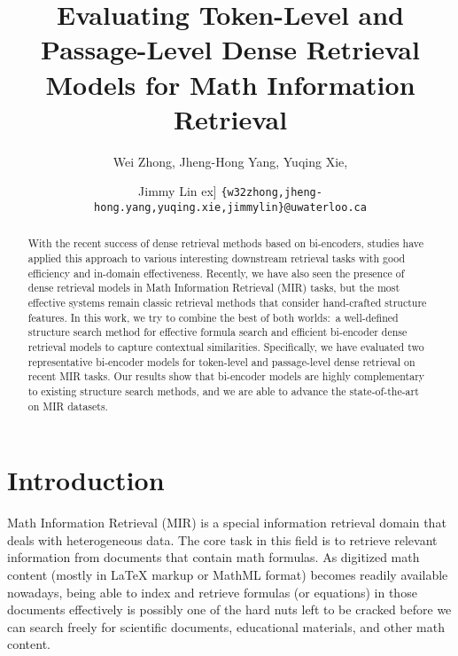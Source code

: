 \documentclass[11pt]{article}
\title{Evaluating Token-Level and Passage-Level Dense Retrieval Models for Math Information Retrieval}
\author{Wei Zhong, Jheng-Hong Yang, Yuqing Xie, \and Jimmy Lin \1ex]
  \texttt{\{w32zhong,jheng-hong.yang,yuqing.xie,jimmylin\}@uwaterloo.ca}
}
\begin{document}
\maketitle
\begin{abstract}
With the recent success of dense retrieval methods based on bi-encoders, studies have applied this approach to various interesting downstream retrieval tasks with good efficiency and in-domain effectiveness.
Recently, we have also seen the presence of dense retrieval models in Math Information Retrieval (MIR) tasks,
but the most effective systems remain classic retrieval methods that consider hand-crafted structure features.
In this work, we try to combine the best of both worlds:\ a well-defined structure search method for effective formula search and efficient bi-encoder dense retrieval models to capture contextual similarities.
Specifically, we have evaluated two representative bi-encoder models for token-level and passage-level dense retrieval on recent MIR tasks.
Our results show that bi-encoder models are highly complementary to existing structure search methods, and we are able to advance the state-of-the-art on MIR datasets.
\end{abstract}

\section{Introduction}

Math Information Retrieval (MIR) is a special information retrieval domain that deals with heterogeneous data.
The core task in this field is to retrieve relevant information from documents that contain math formulas.
As digitized math content (mostly in \LaTeX{} markup or MathML format) becomes readily available nowadays,
being able to index and retrieve formulas (or equations) in those documents effectively is possibly one of the hard nuts left to be cracked before we can search freely for scientific documents, educational materials, and other math content.
\end{document}
